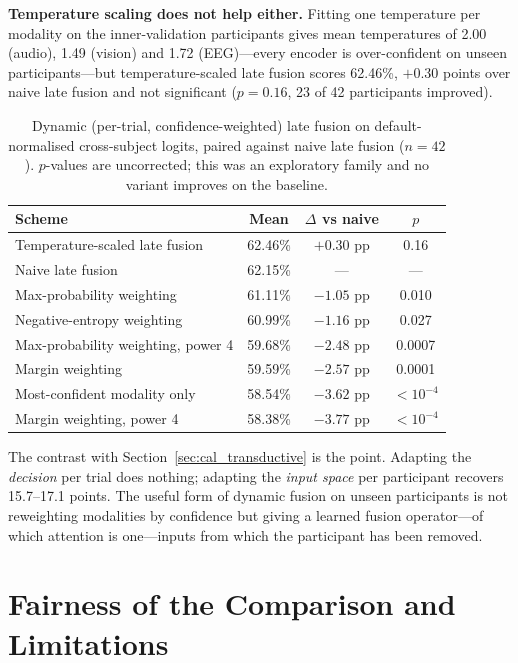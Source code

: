 \textbf{Temperature scaling does not help either.} Fitting one temperature per
modality on the inner-validation participants \cite{Guo2017Calibration} gives mean
temperatures of 2.00 (audio), 1.49 (vision) and 1.72 (EEG)---every encoder is
over-confident on unseen participants---but temperature-scaled late fusion scores
62.46\%, $+0.30$ points over naive late fusion and not significant ($p = 0.16$, 23 of
42 participants improved).

\begin{table}[htbp]
\centering
\small
\caption{Dynamic (per-trial, confidence-weighted) late fusion on default-normalised
cross-subject logits, paired against naive late fusion ($n = 42$). $p$-values are
uncorrected; this was an exploratory family and no variant improves on the baseline.}
\label{tab:dynamic}
\begin{tabular}{lccc}
\hline
\textbf{Scheme} & \textbf{Mean} & \textbf{$\Delta$ vs naive} & \textbf{$p$} \\
\hline
Temperature-scaled late fusion           & 62.46\% & $+0.30$ pp & 0.16 \\
Naive late fusion                        & 62.15\% & ---        & --- \\
Max-probability weighting                & 61.11\% & $-1.05$ pp & 0.010 \\
Negative-entropy weighting               & 60.99\% & $-1.16$ pp & 0.027 \\
Max-probability weighting, power 4       & 59.68\% & $-2.48$ pp & 0.0007 \\
Margin weighting                         & 59.59\% & $-2.57$ pp & 0.0001 \\
Most-confident modality only             & 58.54\% & $-3.62$ pp & $<10^{-4}$ \\
Margin weighting, power 4                & 58.38\% & $-3.77$ pp & $<10^{-4}$ \\
\hline
\end{tabular}
\end{table}

The contrast with Section~\ref{sec:cal_transductive} is the point. Adapting the
\emph{decision} per trial does nothing; adapting the \emph{input space} per participant
recovers 15.7--17.1 points. The useful form of dynamic fusion on unseen participants is
not reweighting modalities by confidence but giving a learned fusion operator---of
which attention is one---inputs from which the participant has been removed.

\section{Fairness of the Comparison and Limitations}
\label{sec:cal_fairness}

